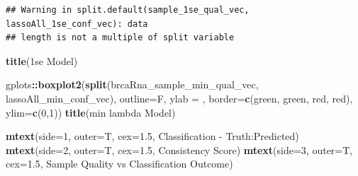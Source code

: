 \documentclass[
]{book}
\newenvironment{Shaded}{\begin{snugshade}}{\end{snugshade}}
\newcommand{\DataTypeTok}[1]{\textcolor[rgb]{0.13,0.29,0.53}{#1}}
\newcommand{\DecValTok}[1]{\textcolor[rgb]{0.00,0.00,0.81}{#1}}
\newcommand{\FloatTok}[1]{\textcolor[rgb]{0.00,0.00,0.81}{#1}}
\newcommand{\KeywordTok}[1]{\textcolor[rgb]{0.13,0.29,0.53}{\textbf{#1}}}
\newcommand{\NormalTok}[1]{#1}
\newcommand{\OperatorTok}[1]{\textcolor[rgb]{0.81,0.36,0.00}{\textbf{#1}}}
\newcommand{\StringTok}[1]{\textcolor[rgb]{0.31,0.60,0.02}{#1}}
\begin{document}
\begin{verbatim}
## Warning in split.default(sample_1se_qual_vec, lassoAll_1se_conf_vec): data
## length is not a multiple of split variable
\end{verbatim}

\begin{Shaded}
\begin{Highlighting}[]
\KeywordTok{title}\NormalTok{(}\StringTok{\textquotesingle{}1se Model\textquotesingle{}}\NormalTok{)}

\NormalTok{gplots}\OperatorTok{::}\KeywordTok{boxplot2}\NormalTok{(}\KeywordTok{split}\NormalTok{(brcaRna\_sample\_min\_qual\_vec, lassoAll\_min\_conf\_vec), }
  \DataTypeTok{outline=}\NormalTok{F, }\DataTypeTok{ylab =} \StringTok{\textquotesingle{}\textquotesingle{}}\NormalTok{,}
  \DataTypeTok{border=}\KeywordTok{c}\NormalTok{(}\StringTok{\textquotesingle{}green\textquotesingle{}}\NormalTok{, }\StringTok{\textquotesingle{}green\textquotesingle{}}\NormalTok{, }\StringTok{\textquotesingle{}red\textquotesingle{}}\NormalTok{, }\StringTok{\textquotesingle{}red\textquotesingle{}}\NormalTok{),}
  \DataTypeTok{ylim=}\KeywordTok{c}\NormalTok{(}\DecValTok{0}\NormalTok{,}\DecValTok{1}\NormalTok{))}
\KeywordTok{title}\NormalTok{(}\StringTok{\textquotesingle{}min lambda Model\textquotesingle{}}\NormalTok{)}


\KeywordTok{mtext}\NormalTok{(}\DataTypeTok{side=}\DecValTok{1}\NormalTok{, }\DataTypeTok{outer=}\NormalTok{T, }\DataTypeTok{cex=}\FloatTok{1.5}\NormalTok{, }\StringTok{\textquotesingle{}Classification {-} Truth:Predicted\textquotesingle{}}\NormalTok{)}
\KeywordTok{mtext}\NormalTok{(}\DataTypeTok{side=}\DecValTok{2}\NormalTok{, }\DataTypeTok{outer=}\NormalTok{T, }\DataTypeTok{cex=}\FloatTok{1.5}\NormalTok{, }\StringTok{\textquotesingle{}Consistency Score\textquotesingle{}}\NormalTok{)}
\KeywordTok{mtext}\NormalTok{(}\DataTypeTok{side=}\DecValTok{3}\NormalTok{, }\DataTypeTok{outer=}\NormalTok{T, }\DataTypeTok{cex=}\FloatTok{1.5}\NormalTok{, }\StringTok{\textquotesingle{}Sample Quality vs Classification Outcome\textquotesingle{}}\NormalTok{)}
\end{Highlighting}
\end{Shaded}
\end{document}
